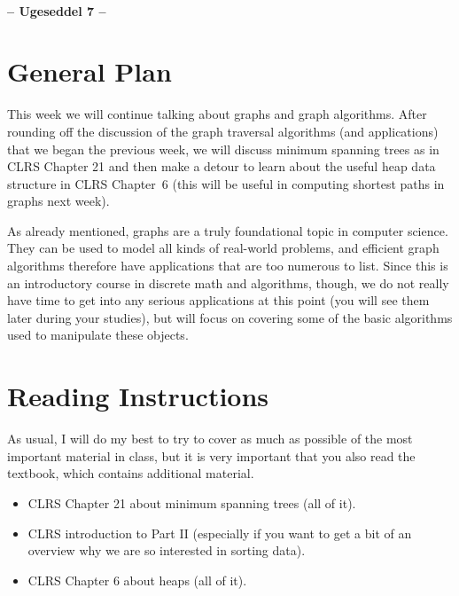\documentclass[12pt,a4paper]{article}
\theoremstyle{plain}
\theoremstyle{definition}
\begin{document}
\begin{center}
\textbf{\large \coursenameshort \\[0.5em] -- Ugeseddel 7 -- \\[0.5em]}
\end{center}
\noindent

\section*{General Plan}

This week we will continue talking about graphs and graph algorithms. After rounding off the discussion of the graph traversal algorithms (and applications) that we began the previous week, we will discuss minimum spanning trees as in CLRS Chapter 21 and then
make a detour to learn about the useful heap data structure in CLRS
Chapter~6 (this will be useful in computing shortest paths in graphs next week). %

As already mentioned, graphs are a truly foundational topic in
computer science. They can be used to model all kinds of real-world
problems, and efficient graph algorithms therefore have applications
that are too numerous to list.  Since this is an introductory course
in discrete math and algorithms, though, we do not really have time to
get into any serious applications at this point (you will see them
later during your studies), but will focus on covering some of the
basic algorithms used to manipulate these objects.


\section*{Reading Instructions}

As usual, I will do my best to try to cover as much as possible of the
most important material in class, but it is very important that you
also read the textbook, which contains additional material.


\begin{itemize}
\item
  CLRS Chapter 21 about minimum spanning trees (all of it).


\item CLRS introduction to Part II
  (especially if you want to get a bit of an overview why we are so
  interested in sorting data).

\item 
  CLRS Chapter 6 about heaps (all of it).

\end{itemize}
\end{document}
